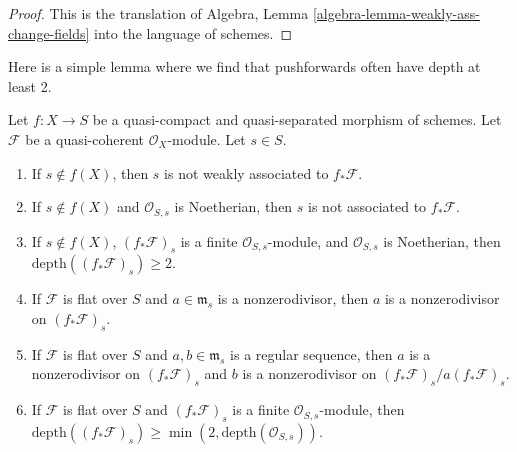 \begin{proof}
This is the translation of
Algebra, Lemma \ref{algebra-lemma-weakly-ass-change-fields}
into the language of schemes.
\end{proof}

\noindent
Here is a simple lemma where we find that pushforwards often have
depth at least 2.

\begin{lemma}
\label{lemma-depth-pushforward}
Let $f : X \to S$ be a quasi-compact and quasi-separated morphism of schemes.
Let $\mathcal{F}$ be a quasi-coherent $\mathcal{O}_X$-module.
Let $s \in S$.
\begin{enumerate}
\item If $s \not \in f(X)$, then $s$ is not weakly associated
to $f_*\mathcal{F}$.
\item If $s \not \in f(X)$ and $\mathcal{O}_{S, s}$ is Noetherian,
then $s$ is not associated to $f_*\mathcal{F}$.
\item If $s \not \in f(X)$, $(f_*\mathcal{F})_s$ is a finite
$\mathcal{O}_{S, s}$-module, and $\mathcal{O}_{S, s}$
is Noetherian, then $\text{depth}((f_*\mathcal{F})_s) \geq 2$.
\item If $\mathcal{F}$ is flat over $S$ and $a \in \mathfrak m_s$
is a nonzerodivisor, then $a$ is a nonzerodivisor on $(f_*\mathcal{F})_s$.
\item If $\mathcal{F}$ is flat over $S$ and $a, b \in \mathfrak m_s$
is a regular sequence, then $a$ is a nonzerodivisor on $(f_*\mathcal{F})_s$
and $b$ is a nonzerodivisor on $(f_*\mathcal{F})_s/a(f_*\mathcal{F})_s$.
\item If $\mathcal{F}$ is flat over $S$ and $(f_*\mathcal{F})_s$
is a finite $\mathcal{O}_{S, s}$-module, then
$\text{depth}((f_*\mathcal{F})_s) \geq
\min(2, \text{depth}(\mathcal{O}_{S, s}))$.
\end{enumerate}
\end{lemma}

